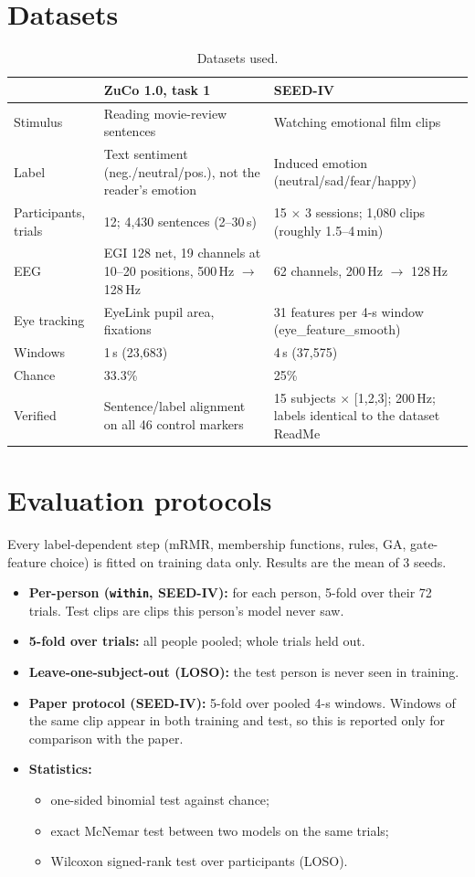 \documentclass[10pt,a4paper]{article}
\begin{document}
\section{Datasets}
\begin{table}[h]
\centering\small
\caption{Datasets used.}\label{tab:data}
\begin{tabularx}{\linewidth}{@{}lYY@{}}
\toprule
 & ZuCo 1.0, task 1 & SEED-IV \\
\midrule
Stimulus & Reading movie-review sentences & Watching emotional film clips \\
Label & Text sentiment (neg./neutral/pos.), not the reader's emotion & Induced emotion (neutral/sad/fear/happy) \\
Participants, trials & 12; 4{,}430 sentences (2--30\,s) & 15 $\times$ 3 sessions; 1{,}080 clips (roughly 1.5--4\,min) \\
EEG & EGI 128 net, 19 channels at 10--20 positions, 500\,Hz $\to$ 128\,Hz & 62 channels, 200\,Hz $\to$ 128\,Hz \\
Eye tracking & EyeLink pupil area, fixations & 31 features per 4-s window (eye\_feature\_smooth) \\
Windows & 1\,s (23{,}683) & 4\,s (37{,}575) \\
Chance & 33.3\% & 25\% \\
Verified & Sentence/label alignment on all 46 control markers & 15 subjects $\times$ [1,2,3]; 200\,Hz; labels identical to the dataset ReadMe \\
\bottomrule
\end{tabularx}
\end{table}

\section{Evaluation protocols}
Every label-dependent step (mRMR, membership functions, rules, GA, gate-feature choice) is fitted on training data only. Results are the mean of 3 seeds.
\begin{itemize}
  \item \textbf{Per-person (\texttt{within}, SEED-IV):} for each person, 5-fold over their 72 trials. Test clips are clips this person's model never saw.
  \item \textbf{5-fold over trials:} all people pooled; whole trials held out.
  \item \textbf{Leave-one-subject-out (LOSO):} the test person is never seen in training.
  \item \textbf{Paper protocol (SEED-IV):} 5-fold over pooled 4-s windows. Windows of the same clip appear in both training and test, so this is reported only for comparison with the paper.
  \item \textbf{Statistics:}
    \begin{itemize}
      \item one-sided binomial test against chance;
      \item exact McNemar test between two models on the same trials;
      \item Wilcoxon signed-rank test over participants (LOSO).
    \end{itemize}
\end{itemize}
\end{document}
